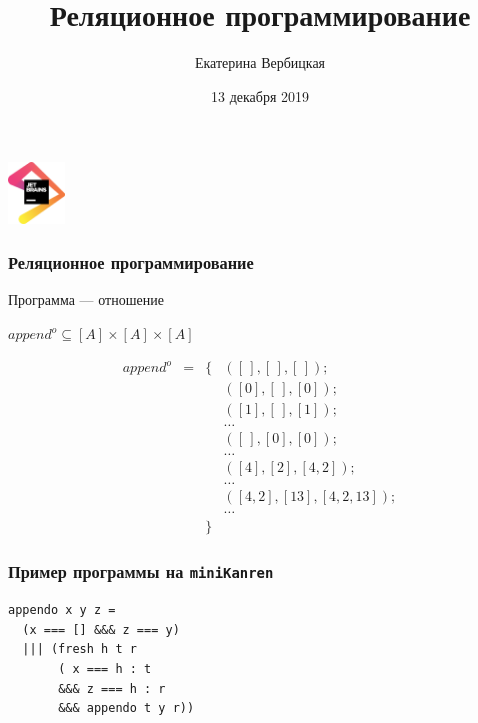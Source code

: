 \documentclass{beamer}
\title[]{Реляционное программирование}
\institute[]{
Лаборатория языковых инструментов JetBrains
}
\author[Екатерина Вербицкая]{Екатерина Вербицкая}
\date{13 декабря 2019}
\newcommand{\miniKanren}{\texttt{miniKanren}}
\begin{document}
{

\begin{frame}
      \begin{center} 
        {\includegraphics[width=1.5cm]{pics/jb.png}} 
      \end{center}

  \titlepage
\end{frame}
}

\begin{frame}[fragile]
  \transwipe[direction=90]
  \frametitle{Реляционное программирование}
  
  \begin{center}
  Программа --- отношение 
  \end{center}
  
\begin{center}
$append^{o} \subseteq [A] \times [A] \times [A] $ 

$$
\begin{array}{lrcl}
append^{o} & = & \{ & ([\,], [\,], [\,]); \\
           &   &    & ([0], [\,], [0]); \\ 
           &   &    & ([1], [\,], [1]); \\
           &   &    & \dots \\
           &   &    & ([\,], [0], [0]); \\
           &   &    & \dots \\
           &   &    & ([4], [2], [4, 2]); \\
           &   &    & \dots \\
           &   &    & ([4, 2], [13], [4, 2, 13]); \\
           &   &    & \dots \\
           &   & \}
\end{array}
$$ 
\end{center}
\end{frame}

\begin{frame}[fragile]
  \transwipe[direction=90]
  \frametitle{Пример программы на \miniKanren}
\begin{center}
\begin{minipage}{4.5cm}
\begin{lstlisting}[frame=single]  
appendo x y z = 
  (x === [] &&& z === y)
  ||| (fresh h t r
       ( x === h : t 
       &&& z === h : r 
       &&& appendo t y r))
\end{lstlisting}
\end{minipage}
\end{center}
\end{frame}
\end{document}
